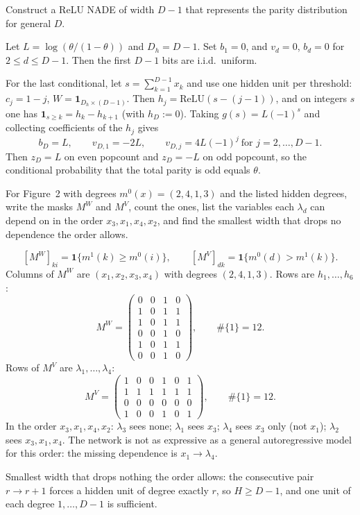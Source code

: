 \begin{hwqbox}
Construct a ReLU NADE of width $D-1$ that represents the parity distribution for general $D$.
\end{hwqbox}
\begin{hwsolbox}
Let $L=\log(\theta/(1-\theta))$ and $D_h=D-1$. Set $b_1=0$, and $v_d=0$, $b_d=0$ for $2\le d\le D-1$. Then the first $D-1$ bits are i.i.d.\ uniform.

For the last conditional, let $s=\sum_{k=1}^{D-1}x_k$ and use one hidden unit per threshold: $c_j=1-j$, $W=\mathbf 1_{D_h\times(D-1)}$. Then $h_j=\mathrm{ReLU}(s-(j-1))$, and on integers $s$ one has $\mathbf 1_{s\ge k}=h_k-h_{k+1}$ (with $h_D:=0$). Taking $g(s)=L(-1)^s$ and collecting coefficients of the $h_j$ gives
\[
b_D=L,\qquad v_{D,1}=-2L,\qquad v_{D,j}=4L(-1)^j\ \text{for }j=2,\ldots,D-1.
\]
Then $z_D=L$ on even popcount and $z_D=-L$ on odd popcount, so the conditional probability that the total parity is odd equals $\theta$.
\end{hwsolbox}

\begin{hwqbox}
For Figure~2 with degrees $m^0(x)=(2,4,1,3)$ and the listed hidden degrees, write the masks $M^W$ and $M^V$, count the ones, list the variables each $\lambda_d$ can depend on in the order $x_3,x_1,x_4,x_2$, and find the smallest width that drops no dependence the order allows.
\end{hwqbox}
\begin{hwsolbox}
\[
[M^W]_{ki}=\mathbf 1\{m^1(k)\ge m^0(i)\},\qquad
[M^V]_{dk}=\mathbf 1\{m^0(d)>m^1(k)\}.
\]
Columns of $M^W$ are $(x_1,x_2,x_3,x_4)$ with degrees $(2,4,1,3)$. Rows are $h_1,\ldots,h_6$:
\[
M^W=\begin{pmatrix}
0&0&1&0\\
1&0&1&1\\
1&0&1&1\\
0&0&1&0\\
1&0&1&1\\
0&0&1&0
\end{pmatrix},\qquad
\#\{1\}=12.
\]
Rows of $M^V$ are $\lambda_1,\ldots,\lambda_4$:
\[
M^V=\begin{pmatrix}
1&0&0&1&0&1\\
1&1&1&1&1&1\\
0&0&0&0&0&0\\
1&0&0&1&0&1
\end{pmatrix},\qquad
\#\{1\}=12.
\]
In the order $x_3,x_1,x_4,x_2$: $\lambda_3$ sees none; $\lambda_1$ sees $x_3$; $\lambda_4$ sees $x_3$ only (not $x_1$); $\lambda_2$ sees $x_3,x_1,x_4$. The network is not as expressive as a general autoregressive model for this order: the missing dependence is $x_1\to\lambda_4$.

Smallest width that drops nothing the order allows: the consecutive pair $r\to r+1$ forces a hidden unit of degree exactly $r$, so $H\ge D-1$, and one unit of each degree $1,\ldots,D-1$ is sufficient.
\end{hwsolbox}

